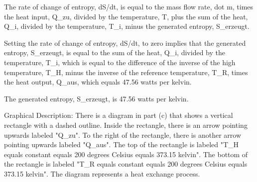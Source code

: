 The rate of change of entropy, dS/dt, is equal to the mass flow rate, dot m, times the heat input, Q_zu, divided by the temperature, T, plus the sum of the heat, Q_i, divided by the temperature, T_i, minus the generated entropy, S_erzeugt.

Setting the rate of change of entropy, dS/dt, to zero implies that the generated entropy, S_erzeugt, is equal to the sum of the heat, Q_i, divided by the temperature, T_i, which is equal to the difference of the inverse of the high temperature, T_H, minus the inverse of the reference temperature, T_R, times the heat output, Q_aus, which equals 47.56 watts per kelvin.

The generated entropy, S_erzeugt, is 47.56 watts per kelvin.

Graphical Description:
There is a diagram in part (c) that shows a vertical rectangle with a dashed outline. Inside the rectangle, there is an arrow pointing upwards labeled "Q_zu". To the right of the rectangle, there is another arrow pointing upwards labeled "Q_aus". The top of the rectangle is labeled "T_H equals constant equals 200 degrees Celsius equals 373.15 kelvin". The bottom of the rectangle is labeled "T_R equals constant equals 200 degrees Celsius equals 373.15 kelvin". The diagram represents a heat exchange process.
